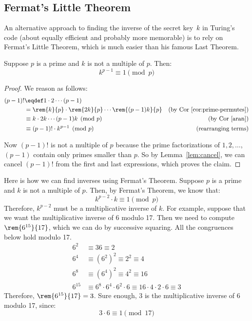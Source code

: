 
\subsection{Fermat's Little Theorem}

An alternative approach to finding the inverse of the secret key~$k$
in Turing's code (about equally efficient and probably more
memorable) is to rely on Fermat's Little Theorem, which is much easier than his
famous Last Theorem.  \iffalse ---and more useful.\fi

\begin{theorem}\label{fermat_little}
Suppose $p$ is a prime and $k$ is not a multiple of $p$.  Then:
%
\[
k^{p-1} \equiv 1 \pmod{p}
\]
\end{theorem}

\begin{proof}
We reason as follows:
\begin{align*}
(p-1)! &\eqdef 1 \cdot 2 \cdots (p-1)\\
       & = \rem{k}{p} \cdot \rem{2k}{p} \cdots \rem{(p-1)k}{p}
           & \text{(by Cor~\ref{cor:prime-permutes})}\\
       & \equiv k \cdot 2k \cdots (p-1) k \pmod{p}
           & \text{(by Cor~\ref{aran})}\\
       & \equiv (p-1)! \cdot k^{p-1} \pmod{p}
           & \text{(rearranging terms)}\\
\end{align*}

Now $(p - 1)!$ is not a multiple of $p$ because the prime
factorizations of $1, 2, \dots$, $(p - 1)$ contain only primes smaller
than $p$.  So by Lemma~\ref{lem:cancel}, we can cancel $(p - 1)!$ from
the first and last expressions, which proves the claim.
\end{proof}

Here is how we can find inverses using Fermat's Theorem.  Suppose $p$
is a prime and $k$ is not a multiple of $p$.  Then, by Fermat's
Theorem, we know that:
%
\[
k^{p-2} \cdot k \equiv 1 \pmod{p}
\]
%
Therefore, $k^{p-2}$ must be a multiplicative inverse of $k$.  For
example, suppose that we want the multiplicative inverse of 6 modulo
17.  Then we need to compute $\rem{6^{15}}{17}$, which we can do by
successive squaring.  All the congruences below hold modulo 17.
%
\begin{align*}
6^2 & \equiv 36 \equiv 2 \\
6^4 & \equiv (6^2)^2 \equiv 2^2 \equiv 4 \\
6^8 & \equiv (6^4)^2 \equiv 4^2 \equiv 16 \\
6^{15} & \equiv 6^8 \cdot 6^4 \cdot 6^2 \cdot 6
       \equiv 16 \cdot 4 \cdot 2 \cdot 6
       \equiv 3
\end{align*}
%
Therefore, $\rem{6^{15}}{17} = 3$.  Sure enough, 3 is the multiplicative
inverse of 6 modulo 17, since:
%
\[
3 \cdot 6 \equiv 1 \pmod{17}
\]

